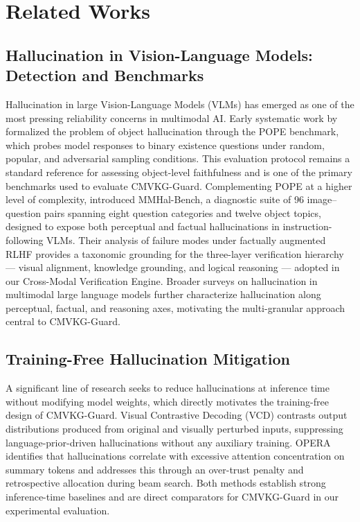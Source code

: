 \section{Related Works}
\label{sec:related_works}

\subsection{Hallucination in Vision-Language Models: Detection and Benchmarks}

Hallucination in large Vision-Language Models (VLMs) has emerged as one of the most pressing reliability concerns in multimodal AI. Early systematic work by \citet{li2023pope} formalized the problem of object hallucination through the POPE benchmark, which probes model responses to binary existence questions under random, popular, and adversarial sampling conditions. This evaluation protocol remains a standard reference for assessing object-level faithfulness and is one of the primary benchmarks used to evaluate CMVKG-Guard. Complementing POPE at a higher level of complexity, \citet{sun2024aligning} introduced MMHal-Bench, a diagnostic suite of 96 image--question pairs spanning eight question categories and twelve object topics, designed to expose both perceptual and factual hallucinations in instruction-following VLMs. Their analysis of failure modes under factually augmented RLHF provides a taxonomic grounding for the three-layer verification hierarchy --- visual alignment, knowledge grounding, and logical reasoning --- adopted in our Cross-Modal Verification Engine. Broader surveys on hallucination in multimodal large language models \citep{bai2024hallucination} further characterize hallucination along perceptual, factual, and reasoning axes, motivating the multi-granular approach central to CMVKG-Guard.

\subsection{Training-Free Hallucination Mitigation}

A significant line of research seeks to reduce hallucinations at inference time without modifying model weights, which directly motivates the training-free design of CMVKG-Guard. Visual Contrastive Decoding (VCD) \citep{leng2024mitigating} contrasts output distributions produced from original and visually perturbed inputs, suppressing language-prior-driven hallucinations without any auxiliary training. OPERA \citep{huang2024opera} identifies that hallucinations correlate with excessive attention concentration on summary tokens and addresses this through an over-trust penalty and retrospective allocation during beam search. Both methods establish strong inference-time baselines and are direct comparators for CMVKG-Guard in our experimental evaluation.

